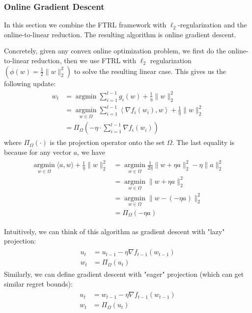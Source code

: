 \documentclass{article}
\begin{document}
\subsubsection{ Online Gradient Descent}
In this section we combine the FTRL framework with $\ell_{2}$-regularization and the online-to-linear reduction. The resulting algorithm is online gradient descent.


Concretely, given any convex online optimization problem, we first do the online-to-linear reduction, then we use FTRL with $\ell_{2}$ regularization $\left(\phi(w)=\frac{1}{2}\|w\|_{2}^{2}\right)$ to solve the resulting linear case. This gives us the following update:
\begin{align*}
\begin{aligned}
w_{t} &=\operatorname{argmin} \sum_{i=1}^{t-1} g_{i}(w)+\frac{1}{\eta}\|w\|_{2}^{2} \\
&=\underset{w \in \Omega}{\operatorname{argmin}} \sum_{i=1}^{t-1}\left\langle\nabla f_{i}\left(w_{i}\right), w\right\rangle+\frac{1}{\eta}\|w\|_{2}^{2} \\
&=\Pi_{\Omega}\left(-\eta \cdot \sum_{i=1}^{t-1} \nabla f_{i}\left(w_{i}\right)\right)
\end{aligned}
\end{align*}
where $\Pi_{\Omega}(\cdot)$ is the projection operator onto the set $\Omega$. The last equality is because for any vector $a$, we have
\begin{align*}
\begin{aligned}
\underset{w \in \Omega}{\operatorname{argmin}}\langle a, w\rangle+\frac{1}{\eta}\|w\|_{2}^{2} &=\underset{w \in \Omega}{\operatorname{argmin}} \frac{1}{2 \eta}\|w+\eta a\|_{2}^{2}-\eta\|a\|_{2}^{2} \\
&=\underset{w \in \Omega}{\operatorname{argmin}}\|w+\eta a\|_{2}^{2} \\
&=\underset{w \in \Omega}{\operatorname{argmin}}\|w-(-\eta a)\|_{2}^{2} \\
&=\Pi_{\Omega}(-\eta a)
\end{aligned}
\end{align*}
\begin{rema}
 Intuitively, we can think of this algorithm as gradient descent with "lazy" projection:
\begin{align*}
\begin{aligned}
u_{t} &=u_{t-1}-\eta \nabla f_{t-1}\left(w_{t-1}\right) \\
w_{t} &=\Pi_{\Omega}\left(u_{t}\right)
\end{aligned}
\end{align*}
Similarly, we can define gradient descent with "eager" projection (which can get similar regret bounds):
\begin{align*}
\begin{aligned}
u_{t} &=w_{t-1}-\eta \nabla f_{t-1}\left(w_{t-1}\right) \\
w_{t} &=\Pi_{\Omega}\left(u_{t}\right)
\end{aligned}
\end{align*}
\end{rema}
\end{document}
